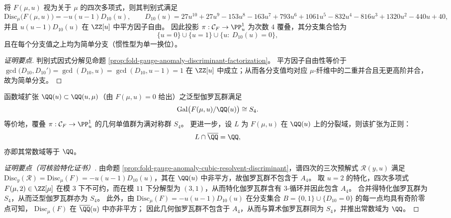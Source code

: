 \begin{conclusion}[判别式的完全分解与简单分支]\label{con:fold-gauge-anomaly-disc-factorization-simple-branch}
将 \(F(\mu,u)\) 视为关于 \(\mu\) 的四次多项式，则其判别式满足
\[
\mathrm{Disc}_{\mu}\bigl(F(\mu,u)\bigr)=-u(u-1)D_{10}(u),
\qquad D_{10}(u)=27u^{10}+27u^{9}-153u^{8}-163u^{7}+793u^{6}+1061u^{5}-832u^{4}-816u^{3}+1320u^{2}-440u+40,
\]
并且 \(u(u-1)D_{10}(u)\) 在 \(\ZZ[u]\) 中平方因子自由。
因此投影 \(\pi:\mathcal C_F\to\PP^1_u\) 为次数 \(4\) 覆叠，其分支集合恰为
\[
\{u=0\}\cup\{u=1\}\cup\{u:\ D_{10}(u)=0\},
\]
且在每个分支值之上均为简单分支（惯性型为单一换位）。
\end{conclusion}
\begin{proof}[证明要点]
判别式因式分解见命题 \ref{prop:fold-gauge-anomaly-discriminant-factorization}。
平方因子自由性等价于
\(
\gcd\!\bigl(D_{10},D_{10}'\bigr)=\gcd(D_{10},u)=\gcd(D_{10},u-1)=1
\)
在 \(\ZZ[u]\) 中成立；从而各分支值均对应 \(\mu\)-纤维中的二重并合且无更高阶并合，故为简单分支。
\end{proof}

\begin{conclusion}\label{con:fold-gauge-anomaly-generic-galois-s4}
函数域扩张 \(\QQ(u)\subset \QQ(u,\mu)\)（由 \(F(\mu,u)=0\) 给出）之泛型伽罗瓦群满足
\[
\mathrm{Gal}\bigl(F(\mu,u)/\QQ(u)\bigr)\cong S_4.
\]
等价地，覆叠 \(\pi:\mathcal C_F\to\PP^1_u\) 的几何单值群为满对称群 \(S_4\)。
更进一步，设 \(L\) 为 \(F(\mu,u)\) 在 \(\QQ(u)\) 上的分裂域，则该扩张为正则：
\[
L\cap \overline{\QQ}=\QQ,
\]
亦即其常数域等于 \(\QQ\)。
\end{conclusion}
\begin{proof}[证明要点（可核验特化证书）]
由命题 \ref{prop:fold-gauge-anomaly-cubic-resolvent-discriminant}，谱四次的三次预解式 \(\mathcal R(y,u)\) 满足
\(
\mathrm{Disc}_y(\mathcal R)=\mathrm{Disc}_{\mu}(F)=-u(u-1)D_{10}(u)
\)，其在 \(\QQ(u)\) 中非平方，故伽罗瓦群不包含于 \(A_4\)。
取 \(u=2\) 的特化，四次多项式 \(F(\mu,2)\in\ZZ[\mu]\) 在模 \(3\) 下不可约，而在模 \(11\) 下分解型为 \((3,1)\)，从而特化伽罗瓦群含有 \(3\)-循环并因此包含 \(A_4\)。
合并得特化伽罗瓦群为 \(S_4\)，从而泛型伽罗瓦群亦为 \(S_4\)。
此外，由 \(\mathrm{Disc}_{\mu}(F)=-u(u-1)D_{10}(u)\) 在分支集合 \(B=\{0,1\}\cup\{D_{10}=0\}\) 的每一点均具有奇阶零点可知，
\(\mathrm{Disc}_{\mu}(F)\) 在 \(\overline{\QQ}(u)\) 中亦非平方；
因此几何伽罗瓦群不包含于 \(A_4\)，从而与算术伽罗瓦群同为 \(S_4\)，并推出常数域为 \(\QQ\)。
\end{proof}

